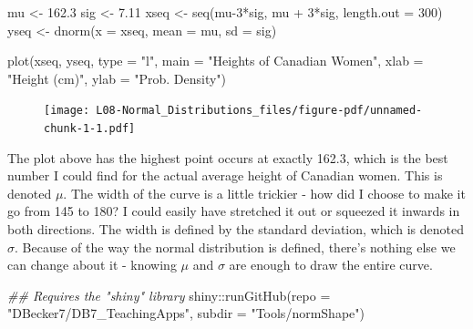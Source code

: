 \documentclass[
  letterpaper,
  DIV=11,
  numbers=noendperiod,
  oneside]{scrreprt}
\newenvironment{Shaded}{\begin{snugshade}}{\end{snugshade}}
\newcommand{\AttributeTok}[1]{\textcolor[rgb]{0.40,0.45,0.13}{#1}}
\newcommand{\DecValTok}[1]{\textcolor[rgb]{0.68,0.00,0.00}{#1}}
\newcommand{\DocumentationTok}[1]{\textcolor[rgb]{0.37,0.37,0.37}{\textit{#1}}}
\newcommand{\FloatTok}[1]{\textcolor[rgb]{0.68,0.00,0.00}{#1}}
\newcommand{\FunctionTok}[1]{\textcolor[rgb]{0.28,0.35,0.67}{#1}}
\newcommand{\NormalTok}[1]{\textcolor[rgb]{0.00,0.23,0.31}{#1}}
\newcommand{\OtherTok}[1]{\textcolor[rgb]{0.00,0.23,0.31}{#1}}
\newcommand{\SpecialCharTok}[1]{\textcolor[rgb]{0.37,0.37,0.37}{#1}}
\newcommand{\StringTok}[1]{\textcolor[rgb]{0.13,0.47,0.30}{#1}}
\begin{document}
\begin{Shaded}
\begin{Highlighting}[]
\NormalTok{mu }\OtherTok{\textless{}{-}} \FloatTok{162.3}
\NormalTok{sig }\OtherTok{\textless{}{-}} \FloatTok{7.11}
\NormalTok{xseq }\OtherTok{\textless{}{-}} \FunctionTok{seq}\NormalTok{(mu}\DecValTok{{-}3}\SpecialCharTok{*}\NormalTok{sig, mu }\SpecialCharTok{+} \DecValTok{3}\SpecialCharTok{*}\NormalTok{sig, }\AttributeTok{length.out =} \DecValTok{300}\NormalTok{)}
\NormalTok{yseq }\OtherTok{\textless{}{-}} \FunctionTok{dnorm}\NormalTok{(}\AttributeTok{x =}\NormalTok{ xseq, }\AttributeTok{mean =}\NormalTok{ mu, }\AttributeTok{sd =}\NormalTok{ sig) }

\FunctionTok{plot}\NormalTok{(xseq, yseq, }\AttributeTok{type =} \StringTok{"l"}\NormalTok{,}
  \AttributeTok{main =} \StringTok{"Heights of Canadian Women"}\NormalTok{,}
  \AttributeTok{xlab =} \StringTok{"Height (cm)"}\NormalTok{, }\AttributeTok{ylab =} \StringTok{"Prob. Density"}\NormalTok{)}
\end{Highlighting}
\end{Shaded}

\begin{figure}[H]

{\centering \texttt{[image: L08-Normal\_Distributions\_files/figure-pdf/unnamed-chunk-1-1.pdf]}

}

\end{figure}

The plot above has the highest point occurs at exactly 162.3, which is
the best number I could find for the actual average height of Canadian
women. This is denoted \(\mu\). The width of the curve is a little
trickier - how did I choose to make it go from 145 to 180? I could
easily have stretched it out or squeezed it inwards in both directions.
The width is defined by the standard deviation, which is denoted
\(\sigma\). Because of the way the normal distribution is defined,
there's nothing else we can change about it - knowing \(\mu\) and
\(\sigma\) are enough to draw the entire curve.

\begin{Shaded}
\begin{Highlighting}[]
\DocumentationTok{\#\# Requires the "shiny" library}
\NormalTok{shiny}\SpecialCharTok{::}\FunctionTok{runGitHub}\NormalTok{(}\AttributeTok{repo =} \StringTok{"DBecker7/DB7\_TeachingApps"}\NormalTok{, }
    \AttributeTok{subdir =} \StringTok{"Tools/normShape"}\NormalTok{)}
\end{Highlighting}
\end{Shaded}
\end{document}
